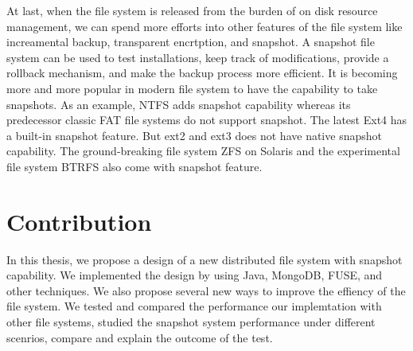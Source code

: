    At last, when the file system is released from the burden of on disk resource management, we can spend more efforts into other features of the file system like increamental backup, transparent encrtption, and snapshot. A snapshot file system can be used to test installations, keep track of modifications, provide a rollback mechanism, and make the backup process more efficient. It is becoming more and more popular in modern file system to have the capability to take snapshots. As an example, NTFS adds snapshot capability whereas its predecessor classic FAT file systems do not support snapshot. The latest Ext4 has a built-in snapshot feature. But ext2 and ext3 does not have native snapshot capability. The ground-breaking file system ZFS on Solaris and the experimental file system BTRFS also come with snapshot feature.

\section{Contribution}

    In this thesis, we propose a design of a new distributed file system with snapshot capability. We implemented the design by using Java, MongoDB, FUSE, and other techniques. We also propose several new ways to improve the effiency of the file system. We tested and compared the performance our implemtation with other file systems, studied the snapshot system performance under different scenrios, compare and explain the outcome of the test.

